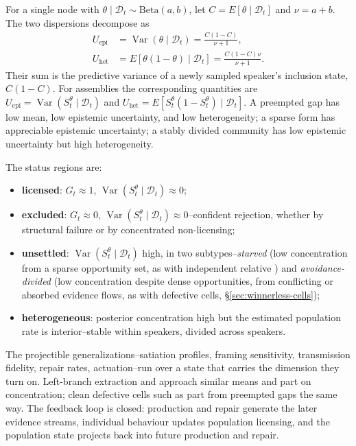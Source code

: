For a single node with
$\theta\mid\mathcal{D}_t\sim\mathrm{Beta}(a,b)$, let
$C=E[\theta\mid\mathcal{D}_t]$ and $\nu=a+b$. The two dispersions decompose as
\begin{align}
U_{\mathrm{epi}} &= \operatorname{Var}(\theta\mid\mathcal{D}_t)
  =\frac{C(1-C)}{\nu+1},\\
U_{\mathrm{het}} &= E[\theta(1-\theta)\mid\mathcal{D}_t]
  =\frac{C(1-C)\nu}{\nu+1}.
\end{align}
Their sum is the predictive variance of a newly sampled speaker's inclusion
state, $C(1-C)$. For assemblies the corresponding quantities are
$U_{\mathrm{epi}}=\operatorname{Var}(S_t^{\theta}\mid\mathcal{D}_t)$ and
$U_{\mathrm{het}}=E[S_t^{\theta}(1-S_t^{\theta})\mid\mathcal{D}_t]$. A
preempted gap has low mean, low epistemic uncertainty, and low heterogeneity; a
sparse form has appreciable epistemic uncertainty; a stably divided community
has low epistemic uncertainty but high heterogeneity.

The status regions are:

\begin{itemize}
\item \textbf{licensed}: $G_t\approx1$,
  $\operatorname{Var}(S_t^{\theta}\mid\mathcal{D}_t)\approx0$;
\item \textbf{excluded}: $G_t\approx0$,
  $\operatorname{Var}(S_t^{\theta}\mid\mathcal{D}_t)\approx0$--confident
  rejection, whether by structural failure or by concentrated non-licensing;
\item \textbf{unsettled}: $\operatorname{Var}(S_t^{\theta}\mid\mathcal{D}_t)$
  high, in two subtypes--\emph{starved} (low concentration from a sparse
  opportunity set, as with independent relative ) and
  \emph{avoidance-divided} (low concentration despite dense opportunities, from
  conflicting or absorbed evidence flows, as with defective cells,
  \S\ref{sec:winnerless-cells});
\item \textbf{heterogeneous}: posterior concentration high but the estimated
  population rate is interior--stable within speakers, divided across speakers.
\end{itemize}

The projectible generalizations--satiation profiles, framing sensitivity, transmission fidelity, repair rates, actuation--run over a state that carries the dimension they turn on. Left-branch extraction and  approach similar means and part on concentration; clean defective cells such as   part from preempted gaps the same way. The feedback loop is closed: production and repair generate the later evidence streams, individual behaviour updates population licensing, and the population state projects back into future production and repair.

